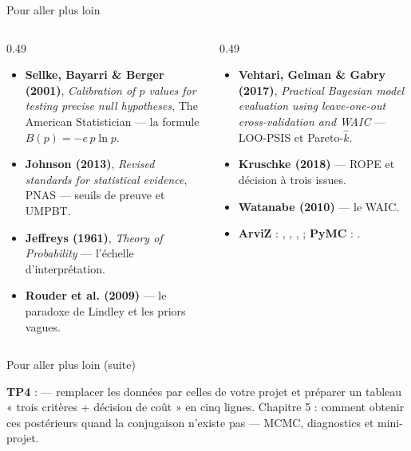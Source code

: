 \begin{frame}{Pour aller plus loin}
\small
\begin{columns}[t]
\begin{column}{0.49\textwidth}
\begin{ebox}
\begin{itemize}
  \item \textbf{Sellke, Bayarri \& Berger (2001)}, \textit{Calibration of
        $p$ values for testing precise null hypotheses}, The American
        Statistician --- la formule $B(p) = -e\,p\ln p$.
  \item \textbf{Johnson (2013)}, \textit{Revised standards for statistical
        evidence}, PNAS --- seuils de preuve et UMPBT.
  \item \textbf{Jeffreys (1961)}, \textit{Theory of Probability} ---
        l'échelle d'interprétation.
  \item \textbf{Rouder et al. (2009)} --- le paradoxe de Lindley et les
        priors vagues.
\end{itemize}
\end{ebox}
\end{column}
\begin{column}{0.49\textwidth}
\begin{ebox}
\begin{itemize}
  \item \textbf{Vehtari, Gelman \& Gabry (2017)}, \textit{Practical
        Bayesian model evaluation using leave-one-out cross-validation
        and WAIC} --- LOO-PSIS et Pareto-$\hat k$.
  \item \textbf{Kruschke (2018)} --- ROPE et décision à trois issues.
  \item \textbf{Watanabe (2010)} --- le WAIC.
  \item \textbf{ArviZ} : , , ,
         ; \textbf{PyMC} : .
\end{itemize}
\end{ebox}
\end{column}
\end{columns}
\vspace{1mm}
\end{frame}

\begin{frame}{Pour aller plus loin (suite)}
\begin{kbox}
\textbf{TP4} : 
— remplacer les données par celles de votre projet et préparer un tableau
« trois critères + décision de coût » en cinq lignes.
Chapitre 5 : comment obtenir ces postérieurs quand la conjugaison
n'existe pas --- MCMC, diagnostics et mini-projet.
\end{kbox}
\end{frame}

